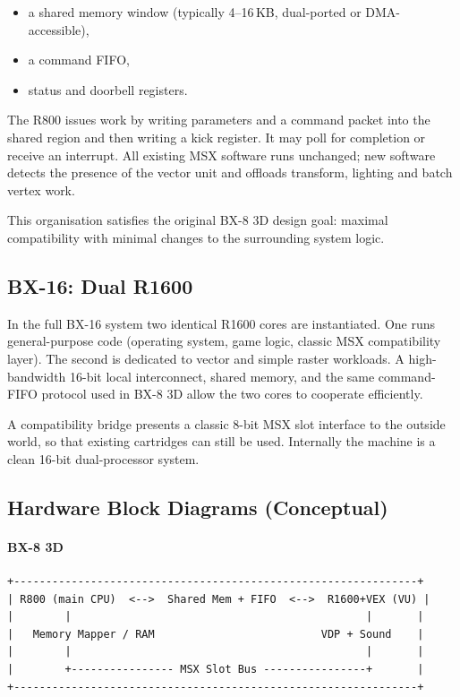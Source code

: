 \documentclass[11pt,a4paper]{article}
\begin{document}
\begin{itemize}
    \item a shared memory window (typically 4--16\,KB, dual-ported or DMA-accessible),
    \item a command FIFO,
    \item status and doorbell registers.
\end{itemize}

The R800 issues work by writing parameters and a command packet into the shared region and then writing a kick register. It may poll for completion or receive an interrupt. All existing MSX software runs unchanged; new software detects the presence of the vector unit and offloads transform, lighting and batch vertex work.

This organisation satisfies the original BX-8 3D design goal: maximal compatibility with minimal changes to the surrounding system logic.

\subsection{BX-16: Dual R1600}

In the full BX-16 system two identical R1600 cores are instantiated. One runs general-purpose code (operating system, game logic, classic MSX compatibility layer). The second is dedicated to vector and simple raster workloads. A high-bandwidth 16-bit local interconnect, shared memory, and the same command-FIFO protocol used in BX-8 3D allow the two cores to cooperate efficiently.

A compatibility bridge presents a classic 8-bit MSX slot interface to the outside world, so that existing cartridges can still be used. Internally the machine is a clean 16-bit dual-processor system.

\subsection{Hardware Block Diagrams (Conceptual)}

\paragraph{BX-8 3D}
\begin{verbatim}
+---------------------------------------------------------------+
| R800 (main CPU)  <-->  Shared Mem + FIFO  <-->  R1600+VEX (VU) |
|        |                                              |       |
|   Memory Mapper / RAM                          VDP + Sound    |
|        |                                              |       |
|        +---------------- MSX Slot Bus ----------------+       |
+---------------------------------------------------------------+
\end{verbatim}
\end{document}
